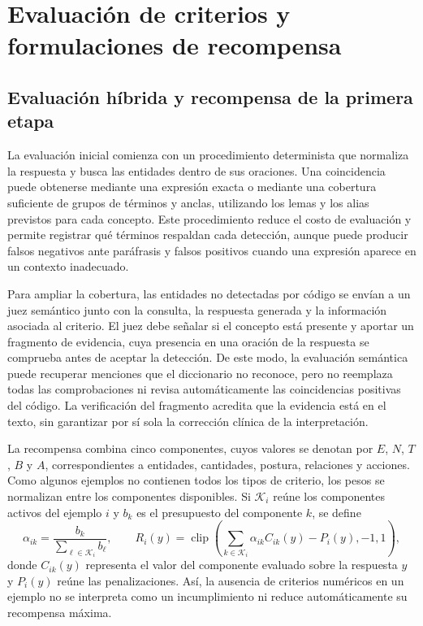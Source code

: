 \section{Evaluación de criterios y formulaciones de recompensa}
\label{sec:metodo-recompensa}
\subsection{Evaluación híbrida y recompensa de la primera etapa}
La evaluación inicial comienza con un procedimiento determinista que normaliza la respuesta y busca las entidades dentro de sus oraciones. Una coincidencia puede obtenerse mediante una expresión exacta o mediante una cobertura suficiente de grupos de términos y anclas, utilizando los lemas y los alias previstos para cada concepto. Este procedimiento reduce el costo de evaluación y permite registrar qué términos respaldan cada detección, aunque puede producir falsos negativos ante paráfrasis y falsos positivos cuando una expresión aparece en un contexto inadecuado.

Para ampliar la cobertura, las entidades no detectadas por código se envían a un juez semántico junto con la consulta, la respuesta generada y la información asociada al criterio. El juez debe señalar si el concepto está presente y aportar un fragmento de evidencia, cuya presencia en una oración de la respuesta se comprueba antes de aceptar la detección. De este modo, la evaluación semántica puede recuperar menciones que el diccionario no reconoce, pero no reemplaza todas las comprobaciones ni revisa automáticamente las coincidencias positivas del código. La verificación del fragmento acredita que la evidencia está en el texto, sin garantizar por sí sola la corrección clínica de la interpretación.

La recompensa combina cinco componentes, cuyos valores se denotan por $E$, $N$, $T$, $B$ y $A$, correspondientes a entidades, cantidades, postura, relaciones y acciones. Como algunos ejemplos no contienen todos los tipos de criterio, los pesos se normalizan entre los componentes disponibles. Si $\mathcal{K}_i$ reúne los componentes activos del ejemplo $i$ y $b_k$ es el presupuesto del componente $k$, se define
\begin{equation}
\alpha_{ik}=\frac{b_k}{\sum_{\ell\in\mathcal{K}_i}b_\ell},
\qquad
R_i(y)=\operatorname{clip}\!\left(
\sum_{k\in\mathcal{K}_i}\alpha_{ik}C_{ik}(y)-P_i(y),-1,1\right),
\label{eq:metodo-recompensa}
\end{equation}
donde $C_{ik}(y)$ representa el valor del componente evaluado sobre la respuesta $y$ y $P_i(y)$ reúne las penalizaciones. Así, la ausencia de criterios numéricos en un ejemplo no se interpreta como un incumplimiento ni reduce automáticamente su recompensa máxima.

